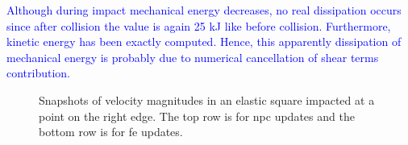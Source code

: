 \documentclass[preprint,12pt,a4paper]{elsarticle}
\newcommand{\MODIFIED}[1]{
  \textcolor{blue}{{#1}}
}
\begin{document}
\MODIFIED{Although during impact mechanical energy decreases, no real dissipation occurs since after collision the value is again 25 kJ like before collision. Furthermore, kinetic energy has been exactly computed. Hence, this apparently dissipation of mechanical energy is probably due to numerical cancellation of shear terms contribution. }
\begin{figure}
  \centering
  \caption{Snapshots of velocity magnitudes in an elastic square impacted at a point on the right edge. The top row is for \acrshort{npc} updates and the bottom row is for \acrshort{fe} updates.}
  \label{fig:Energy_impact_square}
\end{figure}
\end{document}
